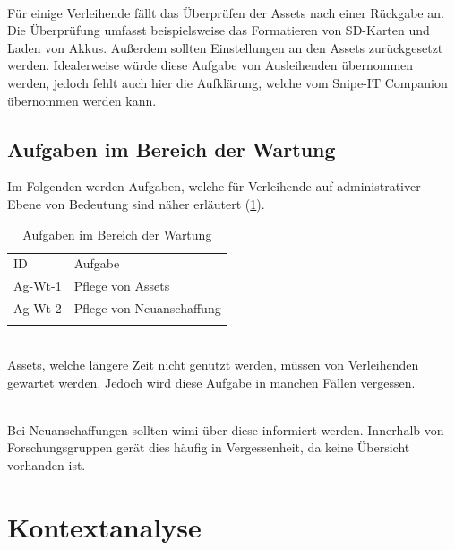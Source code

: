 {\sffamily\color{maincolor}{Ag-Rg-2 | Überprüfung der Assets}}\\
Für einige Verleihende fällt das Überprüfen der Assets nach einer Rückgabe an. Die Überprüfung
umfasst beispielsweise das Formatieren von SD-Karten und Laden von Akkus. Außerdem sollten
Einstellungen an den Assets zurückgesetzt werden. Idealerweise würde diese Aufgabe von Ausleihenden
übernommen werden, jedoch fehlt auch hier die Aufklärung, welche vom Snipe-IT Companion übernommen
werden kann.
\subsection{Aufgaben im Bereich der Wartung}
\label{subsec:wartung}
Im Folgenden werden Aufgaben, welche für Verleihende auf administrativer Ebene von Bedeutung sind
näher erläutert (\ref{table:Ag-Wt}).

\begin{table}[h]
        \centering
        \caption{Aufgaben im Bereich der Wartung}
        \begin{tabular}{ll}
                \arrayrulecolor{maincolor}\hline
                \sffamily\color{maincolor}ID & \sffamily\color{maincolor}Aufgabe \\
                \arrayrulecolor{maincolor}\hline
                Ag-Wt-1                      & Pflege von Assets                 \\
                Ag-Wt-2                      & Pflege von Neuanschaffung         \\
                \arrayrulecolor{maincolor}\hline
        \end{tabular}
        \label{table:Ag-Wt}
\end{table}

{\sffamily\color{maincolor}{Ag-Wt-1 | Pflege von Assets}}\\
Assets, welche längere Zeit nicht genutzt werden, müssen von Verleihenden gewartet werden. Jedoch
wird diese Aufgabe in manchen Fällen vergessen.

{\sffamily\color{maincolor}{Ag-Wt-2 | Pflege von Assets}} \\
Bei Neuanschaffungen sollten \ac{wimi} über diese informiert werden. Innerhalb von
Forschungsgruppen gerät dies häufig in Vergessenheit, da keine Übersicht vorhanden ist.

\section{Kontextanalyse}
\label{section:kontext}

